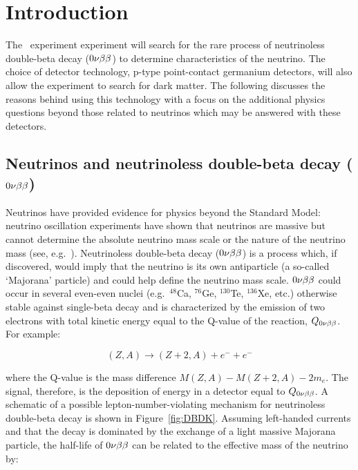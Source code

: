 
\chapter{Introduction}
	\label{chap:IntroChapter}

	The \MJ~experiment experiment will search for the rare process of 
neutrinoless double-beta decay ($0 \nu \beta \beta$) to determine characteristics of the neutrino.  The 
choice of detector technology, p-type point-contact germanium detectors, 
will also allow the experiment to search for dark matter.  
The following discusses the reasons behind using this technology with a focus on the
additional physics questions beyond those related to neutrinos which may be answered with these detectors.

	\section{Neutrinos and neutrinoless double-beta decay\texorpdfstring{ ($0 \nu \beta \beta$)}{}}
	
	Neutrinos have provided evidence for physics beyond the Standard Model: 
neutrino oscillation experiments have shown that neutrinos are massive but
cannot determine the absolute neutrino mass scale or the nature of the neutrino
mass (see, e.g.~\cite{Camilleri:2008zz}).  Neutrinoless double-beta decay ($0 \nu \beta \beta$) is a
process which, if discovered, would imply that the neutrino is its own
antiparticle (a so-called `Majorana' particle) and could help define the neutrino
mass scale.  $0 \nu \beta \beta$ could occur in several even-even nuclei (e.g.~$^{48}$Ca,
$^{76}$Ge, $^{130}$Te, $^{136}$Xe, etc.) otherwise stable against
single-beta decay and is characterized by the emission of two electrons with
total kinetic energy equal to the Q-value of the reaction, $Q_{0 \nu \beta \beta}$.  For example:

		\begin{equation}
		(Z,A) \rightarrow (Z+2,A) + e^- + e^-
		\end{equation} 

where the Q-value is the mass difference $M(Z,A)-M(Z+2,A)-2m_e$.  The signal, therefore, 
is the deposition of energy in a detector equal to $Q_{0 \nu \beta \beta}$.
A schematic of a possible lepton-number-violating mechanism for neutrinoless double-beta
decay is shown in Figure~\ref{fig:DBDK}.  Assuming left-handed currents and
that the decay is dominated by the exchange of a light massive Majorana
particle, the half-life of $0 \nu \beta \beta$ can be related to the effective mass of
the neutrino by:

